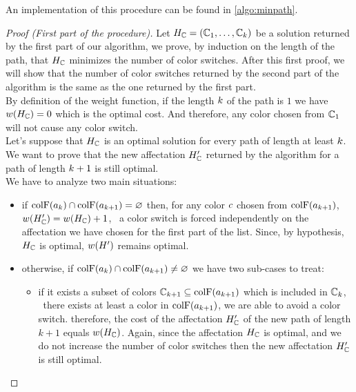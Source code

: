 An implementation of this procedure can be found in \cref{algo:minpath}.



\begin{proof}[Proof (First part of the procedure)]
  Let $H_{\mathbb{C}} = (\mathbb{C}_1,\ldots,\mathbb{C}_{k})$ be a solution returned by the first part of our algorithm, we prove, by induction on the length of the path, that $H_{\mathbb{C}}$ minimizes the number of color switches. After this first proof, we will show that the number of color switches returned by the second part of the algorithm is the same as the one returned by the first part. \\
  By definition of the weight function, if the length $k$ of the path is $1$ we have $w(H_{\mathbb{C}}) = 0$ which is the optimal cost. And therefore, any color chosen from $\mathbb{C}_1$ will not cause any color switch.\\
  Let's suppose that $H_{\mathbb{C}}$ is an optimal solution for every path of length at least $k$. We want to prove that the new affectation $H_{\mathbb{C}}'$ returned by the algorithm for a path of length $k+1$ is still optimal. \\
  We have to analyze two main situations:

  \begin{itemize}
    \item if $\text{colF}(a_k) \cap \text{colF}(a_{k+1}) = \varnothing$ then, for any color $c$ chosen from $\text{colF}(a_{k+1})$, $w(H_{\mathbb{C}}') = w(H_{\mathbb{C}}) + 1$, \ie\ a color switch is forced independently on the affectation we have chosen for the first part of the list. Since, by hypothesis, $H_{\mathbb{C}}$ is optimal, $w(H')$ remains optimal.
    \item otherwise, if $\text{colF}(a_k) \cap \text{colF}(a_{k+1}) \neq \varnothing$ we have two sub-cases to treat:
          \begin{itemize}

            \item if it exists a subset of colors $\mathbb{C}_{k+1} \subseteq \text{colF}(a_{k+1})$ which is included in $\mathbb{C}_k$, \ie\ there exists at least a color in $\text{colF}(a_{k+1})$, we are able to avoid a color switch. therefore, the cost of the affectation $H_{\mathbb{C}}'$ of the new path of length $k+1$ equals $w(H_{\mathbb{C}})$. Again, since the affectation $H_{\mathbb{C}}$ is optimal, and we do not increase the number of color switches then the new affectation $H_{\mathbb{C}}'$ is still optimal.


\end{itemize}
\end{itemize}
\end{proof}
